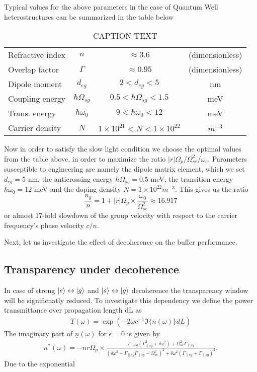 \documentclass[]{spie}  %
\begin{document}
 Typical values for the above parameters in the case of Quantum Well heterostructures can be summarized in the table below
 
 \begin{table}[H]
 	\centering
 	\footnotesize
 	\begin{tabular}{ l | c c c }	
 		\hline 
 		{Refractive index }  & $n$ &   $\approx 3.6$ & (dimensionless) \\
 		{Overlap factor}  & $\Gamma$ &   $\approx 0.95$ & (dimensionless) \\
 		{Dipole moment}  & $d_{eg}$ &   $2 < d_{eg} < 5 $ & nm \\
 		{Coupling energy}  & $\hbar \Omega_{sg}$ &  $0.5 <\hbar \Omega_{sg} < 1.5$ & meV \\
 		{Trans. energy}  & $\hbar\omega_{0}$ & $9 <\hbar\omega_{0}< 12$ & meV \\
 		{Carrier density}  & $N$ & $1\times10^{21} <N<  1\times10^{22}$ & $m^{-3}$\\
 		\hline 
 	\end{tabular}
 	\caption[Table caption text]{ CAPTION TEXT}
 	\label{tab:table02}
 \end{table}
 
 Now in order to satisfy the slow light condition we choose the optimal values from the table above, in order to maximize the ratio $ |r| \Omega_p / \Omega_{se}^2/\omega_c$. Parameters susceptible to engineering are namely the dipole matrix element, which we set $ d_{eg} = 5$ nm, the anticrossing energy $\hbar\Omega_{sg} = 0.5 $ meV, the transition energy $\hbar \omega_0 = 12$ meV and the doping density $N = 1\times 10^{22} m^{-3}$. This gives us the ratio
 $$
 \frac{n_g}{n} = 1+|r|\Omega_p\times\frac{\omega_0}{\Omega_{se}^2} \approx  16.917
 $$
 or almost 17-fold slowdown of the group velocity with respect to the carrier frequency's phase velocity $c/n$. 
 
 Next, let us investigate the effect of decoherence on the buffer performance. 
 \subsection{Transparency under decoherence}
 In case of strong $\ket{e}\leftrightarrow\ket{g}$ and $\ket{s}\leftrightarrow\ket{g}$ decoherence the transparency window will be significnatly reduced. To investigate this dependency we define the power transmittance over 
 propagation length dL as
 \begin{align}
 T(\omega) = \exp(-2\omega c^{-1} \Im \{\underline{n}(\omega)\}dL)
 \end{align}
 The imaginary part of $\underline{n}(\omega)$ for $\epsilon = 0$ is given by
 \begin{align}
 n^{''}(\omega) = -nr\Omega_p\times \frac{\Gamma_{\parallel eg}(\Gamma_{\parallel sg}^2+\delta\omega^2) + \Omega_{se}^{2}\Gamma_{\parallel sg}}{(\delta\omega^2-\Gamma_{\parallel eg}\Gamma_{\parallel sg}-\Omega_{se}^2)^2+\delta\omega^2(\Gamma_{\parallel eg}+\Gamma_{\parallel sg})^2}.
 \end{align}
 Due to the exponential 
 
\end{document}
